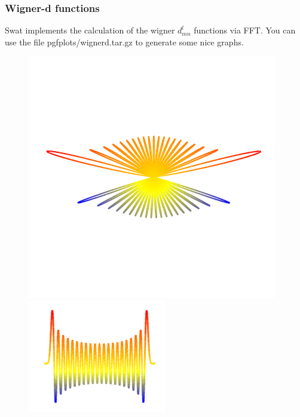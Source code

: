 \documentclass[12pt]{article}
\begin{document}
%
%
%
%

\subsubsection{Wigner-d functions}

Swat implements the calculation of the wigner $d^l_{mn}$ functions via FFT.
You can use the file pgfplots/wignerd.tar.gz to generate some nice graphs.

\begin{figure}
\centering
\includegraphics[scale=1.0]{fig/wignerpolar.pdf}
\includegraphics[scale=1.0]{fig/wigner.pdf} 
\end{figure}
\end{document}
